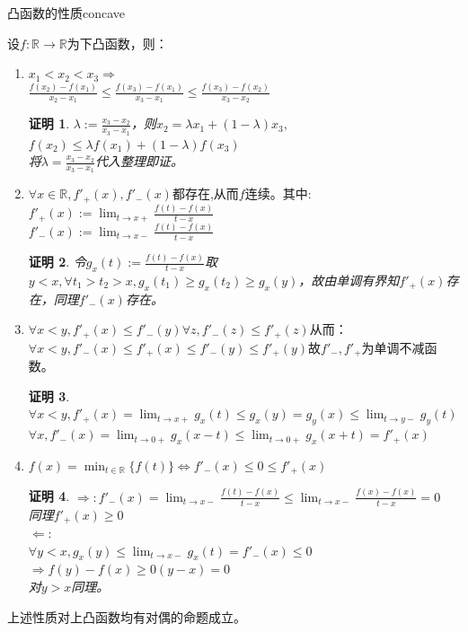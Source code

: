 \documentclass[UTF8, a4paper, 12pt, oneside, twocolumn]{article}
\numberwithin{equation}{section}
\numberwithin{figure}{section}
\numberwithin{table}{section}
\def\({\left(}
\def\){\right)}
\def\dlim{\displaystyle\lim}
\def\dmin{\displaystyle\min}
\def\geq{\geqslant}	%
\def\R{\mathbb{R}}	%
\newtheorem*{Proof}{证明}
\begin{document}
\begin{Proposition}{凸函数的性质}{concave}

设$f:\R\rightarrow\R$为下凸函数，则：
\begin{enumerate}
\item $x_1<x_2<x_3\Rightarrow$\\$\frac{f\(x_2\)-f\(x_1\)}{x_2-x_1}\leq\frac{f\(x_3\)-f\(x_1\)}{x_3-x_1}\leq\frac{f\(x_3\)-f\(x_2\)}{x_3-x_2}$
\begin{Proof}
$\lambda:=\frac{x_3-x_2}{x_3-x_1}$，则$x_2=\lambda x_1+(1-\lambda) x_3,$\\$f\(x_2\)\leq\lambda f\(x_1\)+\(1-\lambda\) f\(x_3\)$\\
将$\lambda=\frac{x_3-x_2}{x_3-x_1}$代入整理即证。
\end{Proof}
\item $\forall x\in \R,f'_+\(x\),f'_-\(x\)$都存在,从而$f$连续。其中:
$f'_+\(x\):=\dlim_{t\rightarrow x+}\frac{f\(t\)-f\(x\)}{t-x}$\\
$f'_-\(x\):=\dlim_{t\rightarrow x-}\frac{f\(t\)-f\(x\)}{t-x}$
\begin{Proof}
令$g_x(t):=\frac{f(t)-f(x)}{t-x}$取$y<x,\forall t_1>t_2>x,g_x(t_1)\geq g_x(t_2)\geq g_x(y)$，故由单调有界知$f'_+(x)$存在，同理$f'_-(x)$存在。
\end{Proof}
\item $\forall x<y,f'_+(x)\leq f'_-(y)\forall z,f'_-(z)\leq f'_+(z)$从而：$\forall x<y,f'_-\(x\)\leq f'_+\(x\)\leq f'_-\(y\)\leq f'_+\(y\)$故$f'_-,f'_+$为单调不减函数。
\begin{Proof}
$\forall x<y,f'_+\(x\)=\dlim_{t\rightarrow x+}g_x\(t\)\leq g_x\(y\)=g_y\(x\)\leq\dlim_{t\rightarrow y-}g_y\(t\)$\\
$\forall x,f'_-(x)=\dlim_{t\rightarrow 0+}g_x(x-t)\leq\dlim_{t\rightarrow 0+}g_x(x+t)=f'_+(x)$
\end{Proof}
\item $f\(x\)=\dmin_{t\in\R}\{f\(t\)\}\Leftrightarrow f'_-\(x\)\leq 0\leq f'_+\(x\)$
\begin{Proof}
$\Rightarrow:f'_-\(x\)=\dlim_{t\rightarrow x-}\frac{f\(t\)-f\(x\)}{t-x}\leq\dlim_{t\rightarrow x-}\frac{f\(x\)-f\(x\)}{t-x}=0$\\
同理$f'_+\(x\)\geq 0$\\
$\Leftarrow:$\\$\forall y<x,g_x\(y\)\leq\dlim_{t\rightarrow x-}g_x\(t\)=f'_-\(x\)\leq 0$\\$\Rightarrow f\(y\)-f\(x\)\geq 0\(y-x\)=0$\\
对$y>x$同理。
\end{Proof}
\end{enumerate}
上述性质对上凸函数均有对偶的命题成立。
\end{Proposition}
\end{document}
